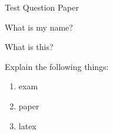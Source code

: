 \documentclass[11pt,paper=a4,answers]{exam}
\begin{document}
\begin{center}
\Large{Test Question Paper}
\end{center}

\begin{questions}

\question
What is my name?

\question 
What is this?

\question
Explain the following things:
\begin{enumerate}
    \item exam
    \item paper
    \item latex
\end{enumerate}


\end{questions}
\end{document}
